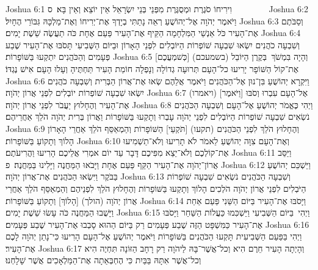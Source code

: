 Joshua 6:1	וִירִיחוֹ סֹגֶרֶת וּמְסֻגֶּרֶת מִפְּנֵי בְּנֵי יִשְׂרָאֵל אֵין יוֹצֵא וְאֵין בָּא׃ {ס}        
Joshua 6:2	וַיֹּאמֶר יְהֹוָה אֶל־יְהוֹשֻׁעַ רְאֵה נָתַתִּי בְיָדְךָ אֶת־יְרִיחוֹ וְאֶת־מַלְכָּהּ גִּבּוֹרֵי הֶחָיִל׃
Joshua 6:3	וְסַבֹּתֶם אֶת־הָעִיר כֹּל אַנְשֵׁי הַמִּלְחָמָה הַקֵּיף אֶת־הָעִיר פַּעַם אֶחָת כֹּה תַעֲשֶׂה שֵׁשֶׁת יָמִים׃
Joshua 6:4	וְשִׁבְעָה כֹהֲנִים יִשְׂאוּ שִׁבְעָה שׁוֹפְרוֹת הַיּוֹבְלִים לִפְנֵי הָאָרוֹן וּבַיּוֹם הַשְּׁבִיעִי תָּסֹבּוּ אֶת־הָעִיר שֶׁבַע פְּעָמִים וְהַכֹּהֲנִים יִתְקְעוּ בַּשּׁוֹפָרוֹת׃
Joshua 6:5	וְהָיָה בִּמְשֹׁךְ  בְּקֶרֶן הַיּוֹבֵל (בשמעכם) [כְּשׁמְעֲכֶם] אֶת־קוֹל הַשּׁוֹפָר יָרִיעוּ כל־הָעָם תְּרוּעָה גְדוֹלָה וְנָפְלָה חוֹמַת הָעִיר תַּחְתֶּיהָ וְעָלוּ הָעָם אִישׁ נֶגְדּוֹ׃
Joshua 6:6	וַיִּקְרָא יְהוֹשֻׁעַ בִּן־נוּן אֶל־הַכֹּהֲנִים וַיֹּאמֶר אֲלֵהֶם שְׂאוּ אֶת־אֲרוֹן הַבְּרִית וְשִׁבְעָה כֹהֲנִים יִשְׂאוּ שִׁבְעָה שׁוֹפְרוֹת יוֹבְלִים לִפְנֵי אֲרוֹן יְהֹוָה׃
Joshua 6:7	(ויאמרו) [וַיֹּאמֶר] אֶל־הָעָם עִבְרוּ וְסֹבּוּ אֶת־הָעִיר וְהֶחָלוּץ יַעֲבֹר לִפְנֵי אֲרוֹן יְהֹוָה׃
Joshua 6:8	וַיְהִי כֶּאֱמֹר יְהוֹשֻׁעַ אֶל־הָעָם וְשִׁבְעָה הַכֹּהֲנִים נֹשְׂאִים שִׁבְעָה שׁוֹפְרוֹת הַיּוֹבְלִים לִפְנֵי יְהֹוָה עָבְרוּ וְתָקְעוּ בַּשּׁוֹפָרוֹת וַאֲרוֹן בְּרִית יְהֹוָה הֹלֵךְ אַחֲרֵיהֶם׃
Joshua 6:9	וְהֶחָלוּץ הֹלֵךְ לִפְנֵי הַכֹּהֲנִים (תקעו) [תֹּקְעֵי] הַשּׁוֹפָרוֹת וְהַמְאַסֵּף הֹלֵךְ אַחֲרֵי הָאָרוֹן הָלוֹךְ וְתָקוֹעַ בַּשּׁוֹפָרוֹת׃
Joshua 6:10	וְאֶת־הָעָם צִוָּה יְהוֹשֻׁעַ לֵאמֹר לֹא תָרִיעוּ וְלֹא־תַשְׁמִיעוּ אֶת־קוֹלְכֶם וְלֹא־יֵצֵא מִפִּיכֶם דָּבָר עַד יוֹם אמְרִי אֲלֵיכֶם הָרִיעוּ וַהֲרִיעֹתֶם׃
Joshua 6:11	וַיַּסֵּב אֲרוֹן־יְהֹוָה אֶת־הָעִיר הַקֵּף פַּעַם אֶחָת וַיָּבֹאוּ הַמַּחֲנֶה וַיָּלִינוּ בַּמַּחֲנֶה׃ {פ}
Joshua 6:12	וַיַּשְׁכֵּם יְהוֹשֻׁעַ בַּבֹּקֶר וַיִּשְׂאוּ הַכֹּהֲנִים אֶת־אֲרוֹן יְהֹוָה׃
Joshua 6:13	וְשִׁבְעָה הַכֹּהֲנִים נֹשְׂאִים שִׁבְעָה שׁוֹפְרוֹת הַיֹּבְלִים לִפְנֵי אֲרוֹן יְהֹוָה הֹלְכִים הָלוֹךְ וְתָקְעוּ בַּשּׁוֹפָרוֹת וְהֶחָלוּץ הֹלֵךְ לִפְנֵיהֶם וְהַמְאַסֵּף הֹלֵךְ אַחֲרֵי אֲרוֹן יְהֹוָה (הולך) [הָלוֹךְ] וְתָקוֹעַ בַּשּׁוֹפָרוֹת׃
Joshua 6:14	וַיָּסֹבּוּ אֶת־הָעִיר בַּיּוֹם הַשֵּׁנִי פַּעַם אַחַת וַיָּשֻׁבוּ הַמַּחֲנֶה כֹּה עָשׂוּ שֵׁשֶׁת יָמִים׃
Joshua 6:15	וַיְהִי  בַּיּוֹם הַשְּׁבִיעִי וַיַּשְׁכִּמוּ כַּעֲלוֹת הַשַּׁחַר וַיָּסֹבּוּ אֶת־הָעִיר כַּמִּשְׁפָּט הַזֶּה שֶׁבַע פְּעָמִים רַק בַּיּוֹם הַהוּא סָבְבוּ אֶת־הָעִיר שֶׁבַע פְּעָמִים׃
Joshua 6:16	וַיְהִי בַּפַּעַם הַשְּׁבִיעִית תָּקְעוּ הַכֹּהֲנִים בַּשּׁוֹפָרוֹת וַיֹּאמֶר יְהוֹשֻׁעַ אֶל־הָעָם הָרִיעוּ כִּי־נָתַן יְהֹוָה לָכֶם אֶת־הָעִיר׃
Joshua 6:17	וְהָיְתָה הָעִיר חֵרֶם הִיא וְכל־אֲשֶׁר־בָּהּ לַיהֹוָה רַק רָחָב הַזּוֹנָה תִּחְיֶה הִיא וְכל־אֲשֶׁר אִתָּהּ בַּבַּיִת כִּי הֶחְבְּאַתָה אֶת־הַמַּלְאָכִים אֲשֶׁר שָׁלָחְנוּ׃

